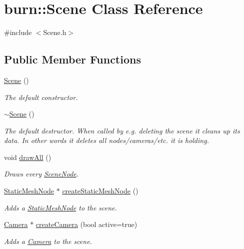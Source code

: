 \hypertarget{classburn_1_1_scene}{\section{burn\-:\-:Scene Class Reference}
\label{classburn_1_1_scene}
}


{\ttfamily \#include $<$Scene.\-h$>$}

\subsection*{Public Member Functions}
\begin{DoxyCompactItemize}
\item 
\hyperlink{classburn_1_1_scene_a09732ed3723c2e68af643fcb6b0a189f}{Scene} ()
\begin{DoxyCompactList}\small\item\em The default constructor. \end{DoxyCompactList}\item 
\hyperlink{classburn_1_1_scene_a7722cda0111bd22ca193174326e66924}{$\sim$\-Scene} ()
\begin{DoxyCompactList}\small\item\em The default destructor. When called by e.\-g. deleting the scene it cleans up its data. In other words it deletes all nodes/cameras/etc. it is holding. \end{DoxyCompactList}\item 
void \hyperlink{classburn_1_1_scene_a5ec4aad558ab7f3299fef632d86da8d3}{draw\-All} ()
\begin{DoxyCompactList}\small\item\em Draws every \hyperlink{classburn_1_1_scene_node}{Scene\-Node}. \end{DoxyCompactList}\item 
\hyperlink{classburn_1_1_static_mesh_node}{Static\-Mesh\-Node} $\ast$ \hyperlink{classburn_1_1_scene_a2e3b91590d6dee8c927c90f4f4d52e37}{create\-Static\-Mesh\-Node} ()
\begin{DoxyCompactList}\small\item\em Adds a \hyperlink{classburn_1_1_static_mesh_node}{Static\-Mesh\-Node} to the scene. \end{DoxyCompactList}\item 
\hyperlink{classburn_1_1_camera}{Camera} $\ast$ \hyperlink{classburn_1_1_scene_a916aabc00fe334e676f5aface60538bd}{create\-Camera} (bool active=true)
\begin{DoxyCompactList}\small\item\em Adds a \hyperlink{classburn_1_1_camera}{Camera} to the scene. \end{DoxyCompactList}\item 

\end{DoxyCompactItemize}
